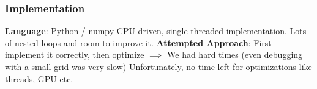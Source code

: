 \documentclass{beamer}
\begin{document}


\begin{frame}[fragile]
\frametitle{Implementation}
\textbf{Language}: Python / numpy
\newline\newline CPU driven, single threaded implementation. Lots of nested loops and room to improve it.
\newline\newline \textbf{Attempted Approach}: First implement it correctly, then optimize $\implies$ We had hard times (even debugging with a small grid was very slow)
\newline\newline Unfortunately, no time left for optimizations like threads, GPU etc.
\end{frame}
\end{document}
